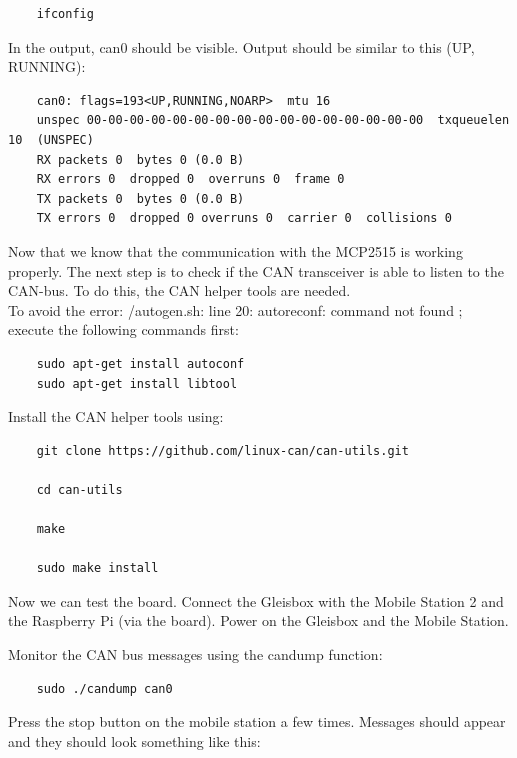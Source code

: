 \begin{verbatim}
	ifconfig
\end{verbatim}

In the output, can0 should be visible. Output should be similar to this (UP, RUNNING):

\begin{verbatim}
	can0: flags=193<UP,RUNNING,NOARP>  mtu 16
	unspec 00-00-00-00-00-00-00-00-00-00-00-00-00-00-00-00  txqueuelen 10  (UNSPEC)
	RX packets 0  bytes 0 (0.0 B)
	RX errors 0  dropped 0  overruns 0  frame 0
	TX packets 0  bytes 0 (0.0 B)
	TX errors 0  dropped 0 overruns 0  carrier 0  collisions 0
\end{verbatim}

Now that we know that the communication with the MCP2515 is working properly. The next step is to check if the CAN transceiver is able to listen to the CAN-bus. To do this, the CAN helper tools are needed. \\

To avoid the error: /autogen.sh: line 20: autoreconf: command not found ; execute the following commands first:

\begin{verbatim}
	sudo apt-get install autoconf
	sudo apt-get install libtool
\end{verbatim}

Install the CAN helper tools using:

\begin{verbatim}
	git clone https://github.com/linux-can/can-utils.git
	
	cd can-utils
	
	make
	
	sudo make install
\end{verbatim}


Now we can test the board. Connect the Gleisbox with the Mobile Station 2 and the Raspberry Pi (via the board). Power on the Gleisbox and the Mobile Station.

Monitor the CAN bus messages using the candump function:

\begin{verbatim}
	sudo ./candump can0
\end{verbatim}

Press the stop button on the mobile station a few times. Messages should appear and they should look something like this:

